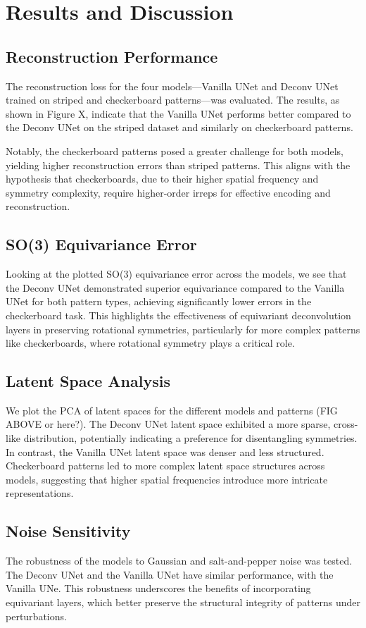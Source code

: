 \documentclass[letterpaper]{article}
\begin{document}
\section{Results and Discussion}

\subsection{Reconstruction Performance}
The reconstruction loss for the four models—Vanilla UNet and Deconv UNet trained on striped and checkerboard patterns—was evaluated. The results, as shown in Figure X, indicate that the Vanilla UNet performs better compared to the Deconv UNet on the striped dataset and similarly on checkerboard patterns.

Notably, the checkerboard patterns posed a greater challenge for both models, yielding higher reconstruction errors than striped patterns. This aligns with the hypothesis that checkerboards, due to their higher spatial frequency and symmetry complexity, require higher-order irreps for effective encoding and reconstruction.

\subsection{SO(3) Equivariance Error}
Looking at the plotted SO(3) equivariance error across the models, we see that the Deconv UNet demonstrated superior equivariance compared to the Vanilla UNet for both pattern types, achieving significantly lower errors in the checkerboard task. This highlights the effectiveness of equivariant deconvolution layers in preserving rotational symmetries, particularly for more complex patterns like checkerboards, where rotational symmetry plays a critical role.

\subsection{Latent Space Analysis}
We plot the PCA of latent spaces for the different models and patterns (FIG ABOVE or here?). The Deconv UNet latent space exhibited a more sparse, cross-like distribution, potentially indicating a preference for disentangling symmetries. In contrast, the Vanilla UNet latent space was denser and less structured. Checkerboard patterns led to more complex latent space structures across models, suggesting that higher spatial frequencies introduce more intricate representations.

\subsection{Noise Sensitivity}
The robustness of the models to Gaussian and salt-and-pepper noise was tested. The Deconv UNet and the Vanilla UNet have similar performance, with the Vanilla UNe. This robustness underscores the benefits of incorporating equivariant layers, which better preserve the structural integrity of patterns under perturbations.
\end{document}

